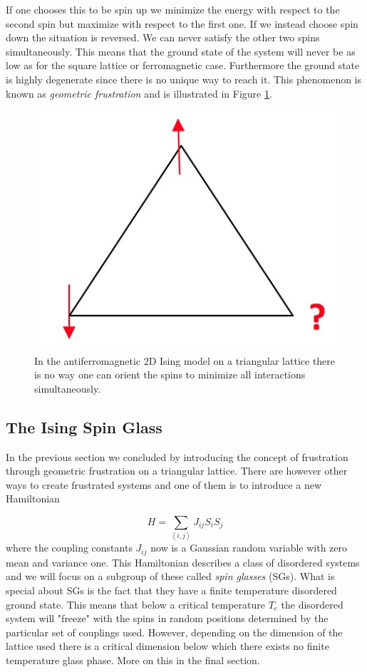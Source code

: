 \documentclass[paper=a4, fontsize=11pt]{scrartcl} %
\numberwithin{equation}{section} %
\numberwithin{figure}{section} %
\numberwithin{table}{section} %
\begin{document}
If one chooses this to be spin up we minimize the energy with respect to the second spin but maximize with respect to the first one. If we instead choose spin down the situation is reversed. We can never satisfy the other two spins simultaneously. This means that the ground state of the system will never be as low as for the square lattice or ferromagnetic case. Furthermore the ground state is highly degenerate since there is no unique way to reach it. This phenomenon is known as \emph{geometric frustration} and is illustrated in Figure \ref{fig:frustration}.

\begin{figure}[hbtp]
\centering
\includegraphics[scale=0.4]{frustration.jpg}
\caption{In the antiferromagnetic 2D Ising model on a triangular lattice there is no way one can orient the spins to minimize all interactions simultaneously.}
\label{fig:frustration}
\end{figure}

\subsection{The Ising Spin Glass}
In the previous section we concluded by introducing the concept of frustration through geometric frustration on a triangular lattice. There are however other ways to create frustrated systems and one of them is to introduce a new Hamiltonian

\begin{equation}
H=\sum\limits_{\left\langle i,j \right\rangle} J_{ij} S_{i} S_{j}
\end{equation}
where the coupling constants $J_{ij}$ now is a Gaussian random variable with zero mean and variance one. This Hamiltonian describes a class of disordered systems and we will focus on a subgroup of these called \emph{spin glasses} (SGs). What is special about SGs is the fact that they have a finite temperature disordered ground state. This means that below a critical temperature $T_c$ the disordered system will "freeze" with the spins in random positions determined by the particular set of couplings used. However, depending on the dimension of the lattice used there is a critical dimension below which there exists no finite temperature glass phase\cite{almeida}. More on this in the final section.
\end{document}
